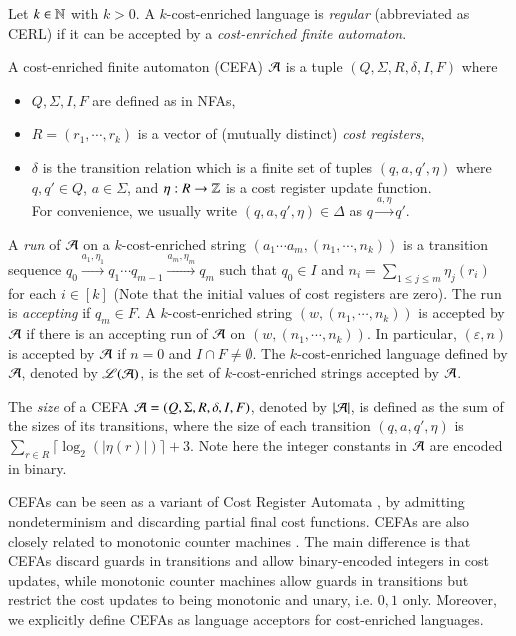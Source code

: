\begin{definition}
	Let $k \in \mathbb{N}$ with $k > 0$. A $k$-cost-enriched language is \emph{regular} (abbreviated as CERL) if it can be accepted by a \emph{cost-enriched finite automaton}. 
	
	A cost-enriched finite automaton (CEFA) $\mathcal{A}$ is a tuple $(Q, \Sigma, R, \delta, I, F)$ where 
	\begin{itemize}
		\item $Q, \Sigma, I, F$ are defined as in NFAs, 
		\item $R=(r_1, \cdots, r_k)$ is a vector of (mutually distinct) \emph{cost registers}, 
		\item $\delta$ is the transition relation which is a finite set of tuples $(q, a, q', \eta)$ where $q, q' \in Q$, $a \in \Sigma$, and %
		$\eta: R \rightarrow \mathbb{Z}$
		is a cost register update function. \\
		For convenience, we usually write $(q, a, q', \eta) \in \Delta$ as $q \xrightarrow{a, \eta} q'$.
	\end{itemize}
	A \emph{run} of $\mathcal{A}$ on a $k$-cost-enriched string $(a_1 \cdots a_m, (n_1, \cdots,n_k))$ is a  transition sequence $q_0 \xrightarrow{a_1, \eta_1} q_1 \cdots q_{m-1} \xrightarrow{a_m, \eta_m} q_m$ such that $q_0 \in I$ and $n_i = \sum \limits_{1\leq j\leq m}\eta_j(r_i)$ for each $i \in [k]$ (Note that the initial values of cost registers are zero). The run is \emph{accepting} if $q_m \in F$. A $k$-cost-enriched string $(w, (n_1, \cdots,n_k))$ is accepted by $\mathcal{A}$ if there is an accepting run of $\mathcal{A}$ on $(w, (n_1, \cdots,n_k))$. In particular, $(\varepsilon, n)$ is accepted by $\mathcal{A}$ if $n=0$ and $I\cap F \neq \emptyset$.
	The $k$-cost-enriched language defined by $\mathcal{A}$, denoted by $\mathscr{L}(\mathcal{A})$, is the set of $k$-cost-enriched strings accepted by $\mathcal{A}$. 
\end{definition}
The \emph{size} of a CEFA $\mathcal{A}=(Q, \Sigma, R, \delta, I, F)$, denoted by $|\mathcal{A}|$, is defined as the sum of the sizes of its transitions, where the size of each transition $(q, a, q', \eta)$ is $\sum \limits_{r \in R} \lceil \log_2 (|\eta(r)|) \rceil +3$. Note here  the integer constants in $\mathcal{A}$ are encoded in binary.

\begin{remark}
	CEFAs can be seen as a variant of Cost Register Automata \cite{RLJ+13}, by admitting nondeterminism and discarding partial final cost functions. CEFAs are also closely related to monotonic counter machines \cite{LB16}. The main difference is that CEFAs discard guards in transitions and allow binary-encoded integers in cost updates, while monotonic counter machines allow guards in transitions but restrict the cost updates to being monotonic and unary, i.e. $0,1$ only. Moreover, we explicitly define CEFAs as language acceptors for  cost-enriched languages.
\end{remark}

